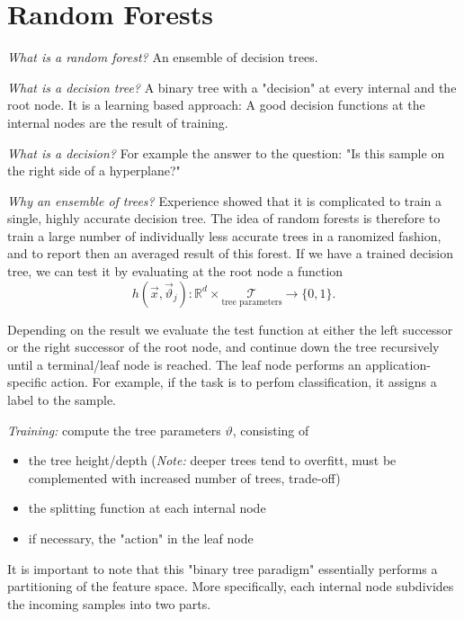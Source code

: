 \documentclass{scrartcl}
\begin{document}
\section{Random Forests}
\textit{What is a random forest?} An ensemble of decision trees.

\textit{What is a decision tree?} A binary tree with a "decision" at every internal and the root node. It is a learning based approach: A good decision functions at the internal nodes are the result of training.

\textit{What is a decision?} For example the answer to the question: "Is this sample on the right side of a hyperplane?"

\textit{Why an ensemble of trees?} Experience showed that it is complicated to train a single, highly accurate decision tree. The idea of random forests is therefore to train a large number of individually less accurate trees in a ranomized fashion, and to report then an averaged result of this forest. 
If we have a trained decision tree, we can test it by evaluating at the root node a function
\[h(\vec{x}, \vec{\vartheta}_j): \mathbb{R}^d \times \underset{\text{tree parameters}}{\mathcal{T}} \rightarrow \{0, 1\}.\]

Depending on the result we evaluate the test function at either the left successor or the right successor of the root node, and continue down the tree recursively until a terminal/leaf node is reached.
The leaf node performs an application-specific action. For example, if the task is to perfom classification, it assigns a label to the sample.

\textit{Training:} compute the tree parameters \(\vartheta\), consisting of
\begin{itemize}
    \item
        the tree height/depth (\textit{Note:} deeper trees tend to overfitt, must be complemented with increased number of trees, trade-off)
    \item
        the splitting function at each internal node
    \item
        if necessary, the "action" in the leaf node
\end{itemize}

It is important to note that this "binary tree paradigm" essentially performs a partitioning of the feature space. More specifically, each internal node subdivides the incoming samples into two parts.
\end{document}
